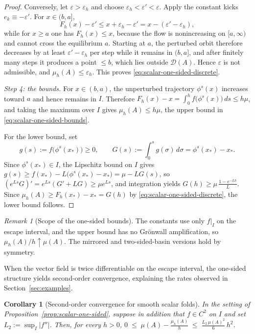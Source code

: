 \documentclass[pdflatex,sn-mathphys-num]{sn-jnl}
\numberwithin{equation}{section}
\theoremstyle{thmstyleone}%
\newtheorem{corollary}[theorem]{Corollary}
\theoremstyle{definition}
\theoremstyle{remark}
\newtheorem{remark}[theorem]{Remark}
\begin{document}
\begin{proof}
Conversely, let $\varepsilon>\varepsilon_h$ and choose
$\varepsilon_h<\varepsilon'<\varepsilon$. Apply the constant kicks
$e_k\equiv-\varepsilon'$. For $x\in(b,a]$,
\[
    F_h(x)-\varepsilon'
    \leq
    x+\varepsilon_h-\varepsilon'
    =
    x-(\varepsilon'-\varepsilon_h),
\]
while for $x\geq a$ one has $F_h(x)\leq x$, because the flow is
nonincreasing on $[a,\infty)$ and cannot cross the equilibrium $a$.
Starting at $a$, the perturbed orbit therefore decreases by at least
$\varepsilon'-\varepsilon_h$ per step while it remains in $(b,a]$, and
after finitely many steps it produces a point $\leq b$, which lies
outside $\mathcal D(A)$. Hence $\varepsilon$ is not admissible, and
$\mu_h(A)\leq\varepsilon_h$. This proves
\eqref{eq:scalar-one-sided-discrete}.

\emph{Step 4: the bounds.}
For $x\in(b,a)$, the unperturbed trajectory $\phi^s(x)$ increases
toward $a$ and hence remains in $I$. Therefore
    $F_h(x)-x
    =
    \int_0^h f\bigl(\phi^s(x)\bigr)\,ds
    \leq
    h\mu$,
and taking the maximum over $I$ gives $\mu_h(A)\leq h\mu$, the upper
bound in \eqref{eq:scalar-one-sided-bounds}.

For the lower bound, set
\[
    g(s):=f\bigl(\phi^s(x_*)\bigr)\geq0,
    \qquad
    G(s):=\int_0^s g(\sigma)\,d\sigma
    =
    \phi^s(x_*)-x_*.
\]
Since $\phi^s(x_*)\in I$, the Lipschitz bound on $I$ gives
    $g(s)
    \geq
    f(x_*)-L\bigl(\phi^s(x_*)-x_*\bigr)
    =
    \mu-LG(s)$,
so $(e^{Ls}G)'=e^{Ls}(G'+LG)\geq\mu e^{Ls}$, and integration yields
    $G(h)\geq\mu\,\frac{1-e^{-Lh}}{L}$.
Since $\mu_h(A)\geq F_h(x_*)-x_*=G(h)$ by
\eqref{eq:scalar-one-sided-discrete}, the lower bound follows.
\end{proof}

\begin{remark}[Scope of the one-sided bounds]
\label{rem:one-sided-scope}
The constants use only $f|_I$ on the escape interval, and the upper bound has no Gr\"onwall amplification, so $\mu_h(A)/h\uparrow\mu(A)$. The mirrored and two-sided-basin versions hold by symmetry.
\end{remark}

When the vector field is twice differentiable on the escape interval,
the one-sided structure yields second-order convergence, explaining
the rates observed in Section~\ref{sec:examples}.

\begin{corollary}[Second-order convergence for smooth scalar folds]
\label{cor:scalar-second-order}
In the setting of Proposition~\ref{prop:scalar-one-sided}, suppose in
addition that $f\in C^2$ on $I$ and set $L_2:=\sup_I|f''|$. Then, for
every $h>0$,
    $0
    \;\leq\;
    \mu(A)-\frac{\mu_h(A)}{h}
    \;\leq\;
    \frac{L_2\,\mu(A)^2}{6}\,h^2$.
\end{corollary}
\end{document}
